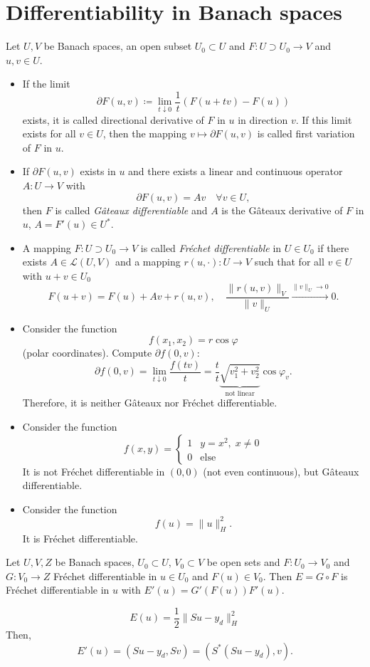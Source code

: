 \documentclass[../skript.tex]{subfiles}
\begin{document}
\section{Differentiability in Banach spaces}
Let $U, V$ be Banach spaces, an open subset $U_0 \subset U$ and $F : U \supset U_0 \to V$ and $u,v \in U$.

\begin{itemize}
\item If the limit
\[
	\partial F(u, v) \coloneqq \lim_{t \downarrow 0} \frac{1}{t} \left( F(u + tv) - F(u) \right)
\]
exists, it is called directional derivative of $F$ in $u$ in direction $v$. If this limit exists for all $v \in U$, then the mapping $v \mapsto \partial F(u, v)$ is called first variation of $F$ in $u$.
\item If $\partial F(u, v)$ exists in $u$ and there exists a linear and continuous operator $A : U \to V$ with
\[
	\partial F(u, v) = Av \quad \forall v \in U,
\]
then $F$ is called \emph{Gâteaux differentiable} and $A$ is the Gâteaux derivative of $F$ in $u$, $A = F'(u) \in U^*$.
\item A mapping $F : U \supset U_0 \to V$ is called \emph{Fréchet differentiable} in $U \in U_0$ if there exists $A \in \mathcal{L}(U, V)$ and a mapping $r(u, \cdot) : U \to V$ such that for all $v \in U$ with $u + v \in U_0$
\[
	F(u + v) = F(u) + Av + r(u, v), \quad \frac{\| r(u, v) \|_V}{\| v \|_U} \xrightarrow{\| v \|_U \to 0} 0.
\]
\end{itemize}
\begin{example}
\begin{itemize}
\item Consider the function
\[
f(x_1, x_2) = r \cos \varphi
\]
(polar coordinates). Compute $\partial f(0, v)$:
\[
	\partial f(0, v) = \lim_{t \downarrow 0} \frac{f(tv)}{t} = \frac{t}{t} \underbrace{ \sqrt{v_1^2 + v_2^2} }_{\text{not linear}} \cos \varphi_v.
\]
Therefore, it is neither Gâteaux nor Fréchet differentiable.
\item Consider the function
\[
f(x, y) = \begin{cases}
1 & y = x^2, \; x \neq 0 \\
0 & \text{else}
\end{cases}
\]
It is not Fréchet differentiable in $(0, 0)$ (not even continuous), but Gâteaux differentiable.
\item Consider the function
\[
	f(u) = \| u \|_H^2.
\]
It is Fréchet differentiable.
\end{itemize}
\end{example}
\begin{theorem}
Let $U, V, Z$ be Banach spaces, $U_0 \subset U$, $V_0 \subset V$ be open sets and $F : U_0 \to V_0$ and $G : V_0 \to Z$ Fréchet differentiable in $u \in U_0$ and $F(u) \in V_0$.
Then $E = G \circ F$ is Fréchet differentiable in $u$ with $E'(u) = G'(F(u)) F'(u)$.
\end{theorem}
\begin{example}
\[
E(u) = \frac{1}{2} \| Su - y_d \|_H^2
\]
Then,
\[
E'(u) = (Su - y_d, Sv) = (S^*(Su - y_d), v).
\]
\end{example}
\end{document}

